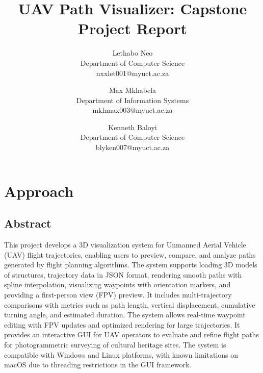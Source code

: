 \documentclass[11pt,a4paper]{article}
\begin{document}
\title{UAV Path Visualizer: Capstone Project Report} \date{}
\author{Lethabo Neo\\Department of Computer Science\\nxxlet001@myuct.ac.za
\and Max Mkhabela\\Department of Information Systems\\mkhmax003@myuct.ac.za
\and Kenneth Baloyi\\Department of Computer Science\\blyken007@myuct.ac.za}
\cfoot{\thepage}
\chead{}
\rhead{\thepage}   %
\lfoot{}

\rfoot{}
\renewcommand{\headrulewidth}{0.0pt}   %

\maketitle
\thispagestyle{plain}  %

\section{Approach}
\subsection*{Abstract}
This project develops a 3D visualization system for Unmanned Aerial Vehicle (UAV) flight trajectories, enabling users to preview, compare, and analyze paths generated by flight planning algorithms. The system supports loading 3D models of structures, trajectory data in JSON format, rendering smooth paths with spline interpolation, visualizing waypoints with orientation markers, and providing a first-person view (FPV) preview. It includes multi-trajectory comparisons with metrics such as path length, vertical displacement, cumulative turning angle, and estimated duration. The system allows real-time waypoint editing with FPV updates and optimized rendering for large trajectories. It provides an interactive GUI for UAV operators to evaluate and refine flight paths for photogrammetric surveying of cultural heritage sites. The system is compatible with Windows and Linux platforms, with known limitations on macOS due to threading restrictions in the GUI framework.
\end{document}
